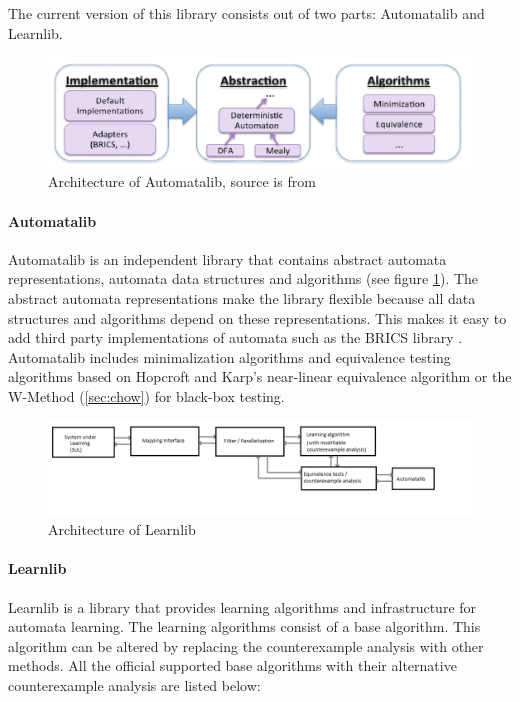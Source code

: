 \documentclass[multi,crop=false,class=article]{standalone}
\begin{document}
The current version of this library consists out of two parts: Automatalib and
Learnlib.

\begin{figure}[!ht]
	\includegraphics[width=\textwidth]{Tool_images/automatalib_architecture.png}
	\caption{Architecture of Automatalib, source is from \cite{Isberner2015b}}
	\label{fig:automatalib_arch}
\end{figure}

\paragraph{Automatalib} Automatalib is an independent library that contains
abstract automata representations, automata data structures and algorithms (see
figure \ref{fig:automatalib_arch}). The
abstract automata representations make the library flexible because all data
structures and algorithms depend on these representations. This makes it easy
to add third party implementations of automata such as the BRICS library
\cite{Alur2005}. Automatalib includes minimalization algorithms and equivalence
testing algorithms based on Hopcroft and Karp's near-linear equivalence
algorithm \cite{Hopcroft1971} or the W-Method (\cref{sec:chow}) for
black-box testing.

\begin{figure}[!ht]
	\includegraphics[width=\textwidth]{Tool_images/learnlib_architecture.png}
	\caption{Architecture of Learnlib}
	\label{fig:learnlib_arch}
\end{figure}

\paragraph{Learnlib} Learnlib is a library that provides learning algorithms and
infrastructure for automata learning. The learning algorithms consist of a base
algorithm. This algorithm can be altered by replacing the counterexample
analysis with other methods. All the official supported base algorithms with
their alternative counterexample analysis are listed below:
\end{document}
